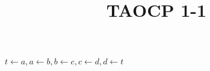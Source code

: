 \documentclass{article}
\title{TAOCP 1\mbox{-}1}
\begin{document}
\maketitle

\( t \leftarrow a, a \leftarrow b, b \leftarrow c, c \leftarrow d, d \leftarrow t \)
\end{document}
